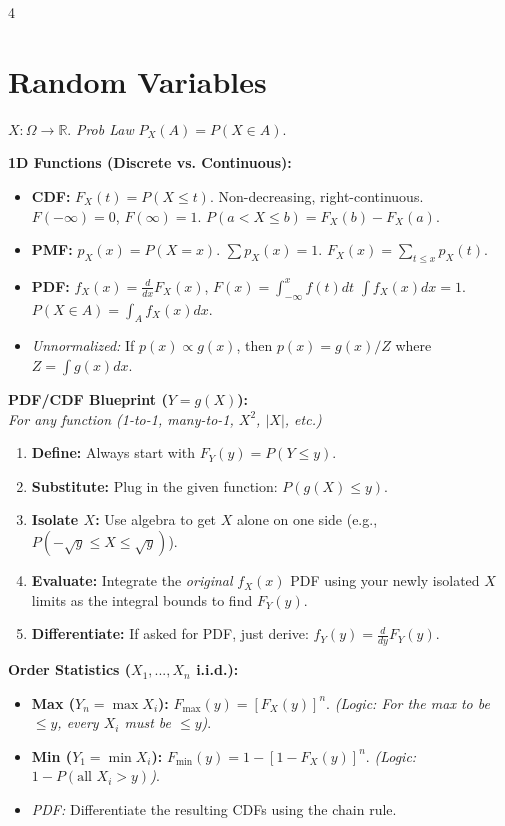 \documentclass[9pt]{extarticle}
\begin{document}
\begin{multicols*}{4}
\section*{Random Variables}
$X: \Omega \to \mathbb{R}$. \textit{Prob Law} $P_X(A) = P(X \in A)$.

\textbf{1D Functions (Discrete vs. Continuous):}
\begin{itemize}
    \item \textbf{CDF:} $F_X(t) = P(X \le t)$. Non-decreasing, right-continuous. $F(-\infty)=0$, $F(\infty)=1$. $P(a < X \le b) = F_X(b) - F_X(a)$.
    \item \textbf{PMF:} $p_X(x) = P(X=x)$. $\sum p_X(x) = 1$. $F_X(x) = \sum_{t \le x} p_X(t)$.
    \item \textbf{PDF:} $f_X(x) = \frac{d}{dx}F_X(x)$, $F(x) = \int_{-\infty}^{x}f(t) dt$ $\int f_X(x)dx = 1$. $P(X \in A) = \int_A f_X(x)dx$.
    \item \textit{Unnormalized:} If $p(x) \propto g(x)$, then $p(x) = g(x)/Z$ where $Z = \int g(x)dx$.
\end{itemize}

\textbf{PDF/CDF Blueprint ($Y = g(X)$):} \\
\textit{For any function (1-to-1, many-to-1, $X^2$, $|X|$, etc.)}
\begin{enumerate}
    \item \textbf{Define:} Always start with $F_Y(y) = P(Y \le y)$.
    \item \textbf{Substitute:} Plug in the given function: $P(g(X) \le y)$.
    \item \textbf{Isolate $X$:} Use algebra to get $X$ alone on one side (e.g., $P(-\sqrt{y} \le X \le \sqrt{y})$).
    \item \textbf{Evaluate:} Integrate the \textit{original} $f_X(x)$ PDF using your newly isolated $X$ limits as the integral bounds to find $F_Y(y)$.
    \item \textbf{Differentiate:} If asked for PDF, just derive: $f_Y(y) = \frac{d}{dy}F_Y(y)$.
\end{enumerate}

\textbf{Order Statistics ($X_1, ..., X_n$ i.i.d.):}
\begin{itemize}
    \item \textbf{Max ($Y_n = \max X_i$):} $F_{\max}(y) = [F_X(y)]^n$. \textit{(Logic: For the max to be $\le y$, every $X_i$ must be $\le y$)}.
    \item \textbf{Min ($Y_1 = \min X_i$):} $F_{\min}(y) = 1 - [1 - F_X(y)]^n$. \textit{(Logic: $1 - P(\text{all } X_i > y)$)}.
    \item \textit{PDF:} Differentiate the resulting CDFs using the chain rule.
\end{itemize}


\end{multicols*}
\end{document}

